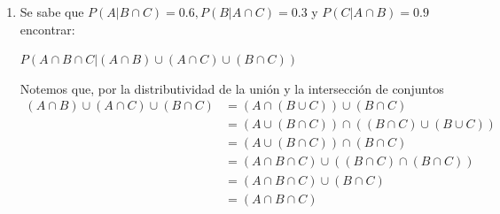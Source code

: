 \documentclass[12pt,a4paper]{report}
\begin{document}
\begin{enumerate}
{\begin{enumerate}[label=\alph*) ]
{			Entoces $P(A\cap B \cap C) = \frac{1}{2} P(A \cap B) = \frac{1}{2} \cdot \frac{1}{10} = \frac{1}{20}$.\\

			Sólo falta encontrar $P(B \cap C)$.\\

			Podemos deducir que
			\begin{align*}
				P(C|B) &= \frac{1}{3}\\
							 &= \frac{P(C \cap B)}{P(B)}\\
				\implies P(C \cap B) &= 	P(C|B) P(B) = \frac{1}{3} P(B)
			\end{align*}

			Pero ¿cuánto vale $P(B)$? Eso se puede saber así

			\begin{align*}
				P(A\cup B) &= \frac{3}{5}\\
									 &= P(A) + P(B) - P(A \cap B)\\
				\implies P(B) &= P(A\cup B) + P(A \cap B) - P(A)\\
									 &= \frac{3}{5} + \frac{1}{10} - \frac{2}{5}\\
									 &= \frac{6+1-4}{10} = \frac{3}{10}
			\end{align*}

			Entonces $P(C \cap B) = \frac{1}{3}P(B) = \frac{1}{3} \cdot \frac{3}{10} = \frac{1}{10}$.\\

			Entonces
			\begin{equation*}
				P(A|B \cap C) = \frac{P(A \cap B \cap C)}{P(B \cap C)} = \frac{\frac{1}{20}}{\frac{1}{10}}	= \frac{10}{20} = \frac{1}{2}
			\end{equation*}
		 }

		 \item{
		 	Se sabe que $P(A|B\cap C)=0.6, P(B|A\cap C)=0.3$ y $P(C|A\cap B)=0.9$ encontrar: \\
		 	\begin{center}
		 	$P(A\cap B\cap C| (A\cap B) \cup (A\cap C) \cup (B\cap C))$
		 	\end{center}
			Notemos que, por la distributividad de la unión y la intersección de conjuntos
			\begin{align*}
				(A\cap B) \cup (A\cap C) \cup (B\cap C) &= (A \cap (B \cup C)) \cup (B \cap C)\\
				 																				&= (A \cup (B \cap C)) \cap ((B \cap C) \cup (B \cup C))\\
																								&= (A \cup (B \cap C)) \cap (B \cap C)\\
																								&= (A \cap B \cap C) \cup ((B \cap C) \cap (B \cap C))\\
																								&= (A \cap B \cap C) \cup (B \cap C)\\
																								&= (A \cap B \cap C)
			\end{align*}

}
\end{enumerate}}
\end{enumerate}
\end{document}
